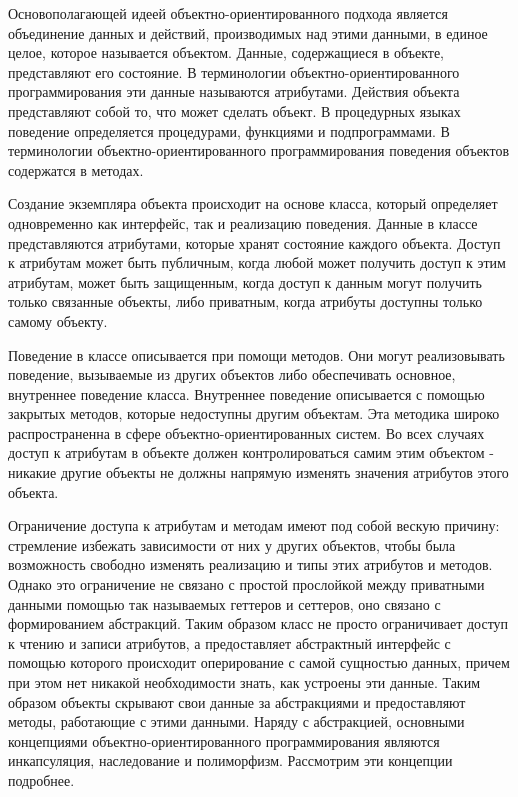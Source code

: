 \documentclass[russian,utf8,simple,hpadding=10mm,vpadding=20mm]{eskdtext}
\begin{document}
Основополагающей идеей объектно-ориентированного подхода является объединение данных и действий, производимых над этими данными, в единое целое, которое называется объектом. Данные, содержащиеся в объекте, представляют его состояние. В терминологии объектно-ориентированного программирования эти данные называются атрибутами. Действия объекта представляют собой то, что может сделать объект. В процедурных языках поведение определяется процедурами, функциями и подпрограммами. В терминологии объектно-ориентированного программирования поведения объектов содержатся в методах.

Создание экземпляра объекта происходит на основе класса, который определяет одновременно как интерфейс, так и реализацию поведения. Данные в классе представляются атрибутами, которые хранят состояние каждого объекта. Доступ к атрибутам может быть публичным, когда любой может получить доступ к этим атрибутам, может быть защищенным, когда доступ к данным могут получить только связанные объекты, либо приватным, когда атрибуты доступны только самому объекту.

Поведение в классе описывается при помощи методов. Они могут реализовывать поведение, вызываемые из других объектов либо обеспечивать основное, внутреннее поведение класса. Внутреннее поведение описывается с помощью закрытых методов, которые недоступны другим объектам.  Эта методика широко распространенна в сфере объектно-ориентированных систем. Во всех случаях доступ к атрибутам в объекте должен контролироваться самим этим объектом - никакие другие объекты не должны напрямую изменять значения атрибутов этого объекта.

Ограничение доступа к атрибутам и методам имеют под собой вескую причину: стремление избежать зависимости от них у других объектов, чтобы была возможность свободно изменять реализацию и типы этих атрибутов и методов.  Однако это ограничение не связано с простой прослойкой  между приватными данными  помощью так называемых геттеров и сеттеров, оно связано с формированием абстракций. Таким образом класс не просто ограничивает доступ к чтению и записи атрибутов,  а предоставляет  абстрактный интерфейс с помощью которого происходит оперирование с самой сущностью данных, причем при этом нет никакой необходимости знать, как устроены эти данные. Таким образом объекты скрывают свои данные за абстракциями и предоставляют методы, работающие с этими данными. Наряду с абстракцией, основными концепциями объектно-ориентированного программирования являются инкапсуляция, наследование и полиморфизм. Рассмотрим эти концепции подробнее.
\end{document}
